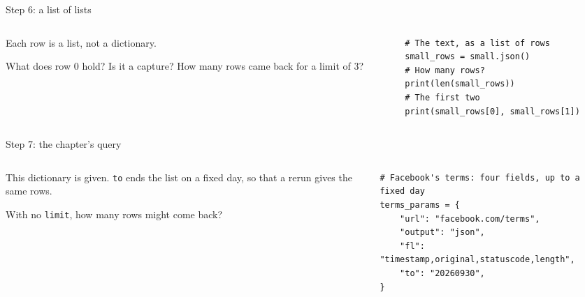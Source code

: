 \documentclass[9pt,aspectratio=169]{beamer}
\begin{document}
\begin{frame}[fragile]{Step 6: a list of lists}
    \begin{columns}[T]
        \begin{column}{0.37\textwidth}
            Each row is a list, not a dictionary.

            \medskip
            What does row 0 hold? Is it a capture? How many rows came back for a limit of 3?
        \end{column}
        \begin{column}{0.6\textwidth}
\begin{lstlisting}
# The text, as a list of rows
small_rows = small.json()
# How many rows?
print(len(small_rows))
# The first two
print(small_rows[0], small_rows[1])
\end{lstlisting}
        \end{column}
    \end{columns}
\end{frame}

\begin{frame}[fragile]{Step 7: the chapter's query}
    \begin{columns}[T]
        \begin{column}{0.37\textwidth}
            This dictionary is given. \texttt{to} ends the list on a fixed day, so that a rerun gives the same rows.

            \medskip
            With no \texttt{limit}, how many rows might come back?
        \end{column}
        \begin{column}{0.6\textwidth}
\begin{lstlisting}
# Facebook's terms: four fields, up to a fixed day
terms_params = {
    "url": "facebook.com/terms",
    "output": "json",
    "fl": "timestamp,original,statuscode,length",
    "to": "20260930",
}
\end{lstlisting}
        \end{column}
    \end{columns}
\end{frame}
\end{document}
